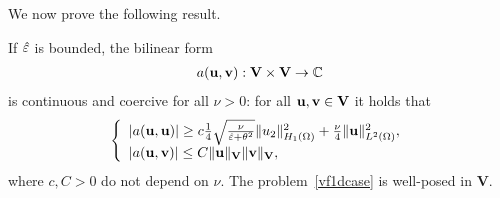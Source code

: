 We now prove the following result.
\begin{lemma}
\label{lemma:well_posedness}
If ${\hat{{\bf \varepsilon}}} $  is bounded, the bilinear form 
\begin{align*}
 a({\bf u},{\bf v}):  \mathbf{V}\times \mathbf{V}\rightarrow \mathbb{C}
\end{align*}
is continuous and coercive for all $\nu>0$: for all ${\bf u},{\bf v}\in \mathbf{V}$ it holds that
\begin{align}
\label{eq:bilinear_cont}
\left\{\begin{array}{l}
|a({\bf u},{\bf u})|\geq c\frac{1}{4} \sqrt{\frac{\nu}{{\hat{{\bf \varepsilon}}} + \theta^2}}\|u_2\|^2_{H_{1}(\Omega)} +  \frac{\nu}{4} \|{\bf u}\|_{L^2(\Omega)}^2,\\
|a({\bf u},{\bf v})|\leq C \|{\bf u}\|_{\mathbf{V}}\|{\bf v}\|_{\mathbf{V}},
\end{array}\right.
\end{align}
where $c, C>0$ do not depend on $\nu$. The problem~\eqref{vf1dcase} is well-posed in $\mathbf{V}$.
\end{lemma}
